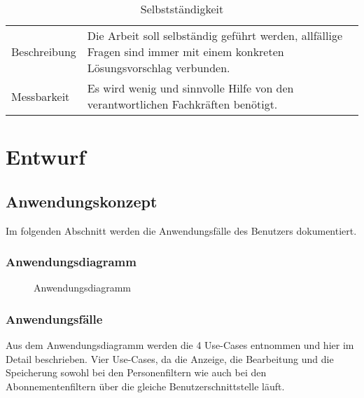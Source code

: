 \begin{table}[h!]
   \begin{tabular}{|L{0.4\textwidth}|L{0.5\textwidth}|}
       \hline
         \\[12pt]
       \hline
       Beschreibung & Die Arbeit soll selbständig geführt werden, allfällige Fragen sind immer mit einem konkreten Lösungsvorschlag verbunden. \\
       \hline
       Messbarkeit & Es wird wenig und sinnvolle Hilfe von den verantwortlichen Fachkräften benötigt. \\
       \hline
     \end{tabular}
     \caption{Selbstständigkeit}
\end{table}

\chapter{Entwurf}
\section{Anwendungskonzept}
Im folgenden Abschnitt werden die Anwendungsfälle des Benutzers dokumentiert.

\subsection{Anwendungsdiagramm}
\begin{figure}[h]
   \centering
   \caption{Anwendungsdiagramm}
\end{figure}

\newpage

\subsection{Anwendungsfälle}
Aus dem Anwendungsdiagramm werden die 4 Use-Cases entnommen und hier im Detail beschrieben. Vier Use-Cases, da die Anzeige,
die Bearbeitung und die Speicherung sowohl bei den Personenfiltern wie auch bei den Abonnementenfiltern über die gleiche Benutzerschnittstelle
läuft.

